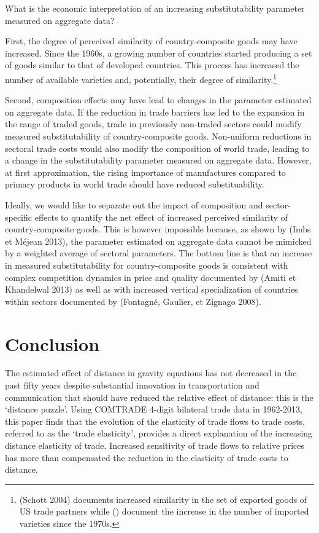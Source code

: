 \documentclass[12pt,twoside,a4paper,notitlepage]{article}
\begin{document}
What is the economic interpretation of an increasing substitutability parameter measured on aggregate data? 

First, the degree of perceived similarity of country-composite goods may have increased.
Since the 1960s, a growing number of countries started producing a set of goods similar to that of developed countries.
This process has increased the number of available varieties and, potentially, their degree of similarity.\footnote{(Schott 2004) documents increased similarity in the set of exported goods of US trade partners while (\cite{Broda2006}) document the increase in the number of imported varieties since the 1970s.
} 

Second, composition effects may have lead to changes in the parameter estimated on aggregate data.
If the reduction in trade barriers has led to the expansion in the range of traded goods, trade in previously non-traded sectors could modify measured substitutability of country-composite goods.
Non-uniform reductions in sectoral trade costs would also modify the composition of world trade, leading to a change in the substitutability parameter measured on aggregate data.
However, at first approximation, the rising importance of manufactures compared to primary products in world trade should have reduced substituability.

Ideally, we would like to separate out the impact of composition and sector-specific effects to quantify the net effect of increased perceived similarity of country-composite goods.
This is however impossible because, as shown by (Imbs et M\'{e}jean 2013), the parameter estimated on aggregate data cannot be mimicked by a weighted average of sectoral parameters.
The bottom line is that an increase in measured substitutability for country-composite goods is consistent with complex competition dynamics in price and quality documented by (Amiti et Khandelwal 2013) as well as with increased vertical specialization of countries within sectors documented by (Fontagn\'{e}, Gaulier, et Zignago 2008).

\section{Conclusion}

The estimated effect of distance in gravity equations has not decreased in the past fifty years despite substantial innovation in transportation and communication that should have reduced the relative effect of distance: this is the `distance puzzle'.
Using COMTRADE 4-digit bilateral trade data in 1962-2013, this paper finds that the evolution of the elasticity of trade flows to trade costs, referred to as the `trade elasticity', provides a direct explanation of the increasing distance elasticity of trade.
Increased sensitivity of trade flows to relative prices has more than compensated the reduction in the elasticity of trade costs to distance.
\end{document}
